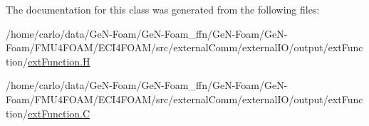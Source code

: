 The documentation for this class was generated from the following files\+:\begin{DoxyCompactItemize}
\item 
/home/carlo/data/\+Ge\+N-\/\+Foam/\+Ge\+N-\/\+Foam\+\_\+ffn/\+Ge\+N-\/\+Foam/\+Ge\+N-\/\+Foam/\+F\+M\+U4\+F\+O\+A\+M/\+E\+C\+I4\+F\+O\+A\+M/src/external\+Comm/external\+I\+O/output/ext\+Function/\hyperlink{extFunction_8H}{ext\+Function.\+H}\item 
/home/carlo/data/\+Ge\+N-\/\+Foam/\+Ge\+N-\/\+Foam\+\_\+ffn/\+Ge\+N-\/\+Foam/\+Ge\+N-\/\+Foam/\+F\+M\+U4\+F\+O\+A\+M/\+E\+C\+I4\+F\+O\+A\+M/src/external\+Comm/external\+I\+O/output/ext\+Function/\hyperlink{extFunction_8C}{ext\+Function.\+C}\end{DoxyCompactItemize}
